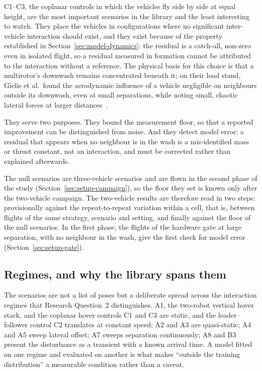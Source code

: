 C1--C3, the coplanar controls in which the vehicles fly side by side at equal height, are the most
important scenarios in the library and the least interesting to watch. They
place the vehicles in configurations where no significant inter-vehicle interaction should exist,
and they exist because of the property established in Section~\ref{sec:model-dynamics}: the
residual is a catch-all, non-zero even in isolated flight, so a residual measured in formation
cannot be attributed to the interaction without a reference.
The physical basis for this choice is that a multirotor's downwash remains concentrated beneath
it; on their load stand, Gielis et al.\ found the aerodynamic influence of a vehicle negligible on
neighbours outside its downwash, even at small separations, while noting small, chaotic lateral
forces at larger distances~\cite{gielis2023aggregate}.

They serve two purposes. They bound the measurement floor, so that a reported improvement can be
distinguished from noise. And they detect model error: a residual that appears when no neighbour is
in the wash is a mis-identified mass or thrust constant, not an interaction, and must be corrected
rather than explained afterwards.

The null scenarios are three-vehicle scenarios and are flown in the second phase of the study
(Section~\ref{sec:setup-campaign}), so the floor they set is known only after the two-vehicle
campaign. The two-vehicle results are therefore read in two steps: provisionally against the
repeat-to-repeat variation within a cell, that is, between flights of the same strategy, scenario
and setting, and finally against the floor of the null scenarios. In the first phase, the flights
of the hardware gate at large separation, with no neighbour in the wash, give the first check for
model error (Section~\ref{sec:setup-gate}).

\subsection{Regimes, and why the library spans them}

The scenarios are not a list of poses but a deliberate spread across the interaction regimes that
Research Question~2 distinguishes. A1, the two-robot vertical hover stack, and the coplanar
hover controls C1 and C3 are static, and the leader--follower control C2 translates at constant
speed; A2 and A3 are quasi-static; A4 and A5
sweep lateral offset; A7 sweeps separation continuously; A8 and B3 present the disturbance as a
transient with a known arrival time. A model fitted on one regime and evaluated on another is what
makes ``outside the training distribution'' a measurable condition rather than a caveat.


